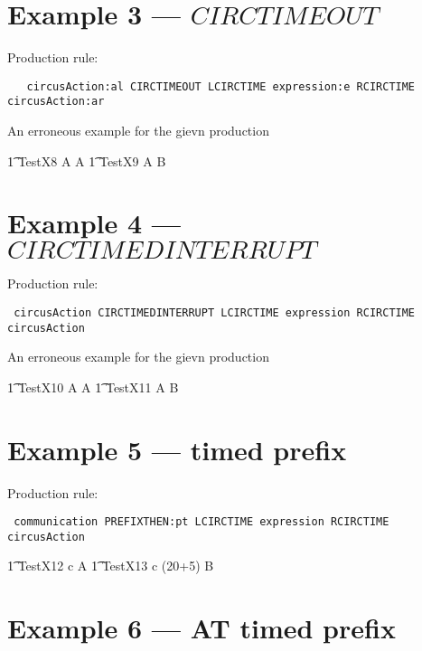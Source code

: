 \section{Example 3 --- $CIRCTIMEOUT$}


Production rule:
\begin{verbatim}
   circusAction:al CIRCTIMEOUT LCIRCTIME expression:e RCIRCTIME  circusAction:ar
\end{verbatim}

An erroneous example for the gievn production 
\begin{circusaction}
	\t1 TestX8 \circdef A  A
	\also
	\t1 TestX9 \circdef  A \circtimeout B 
\end{circusaction}


\section{Example 4 --- $CIRCTIMEDINTERRUPT$}

Production rule:
\begin{verbatim}
 circusAction CIRCTIMEDINTERRUPT LCIRCTIME expression RCIRCTIME circusAction
\end{verbatim}
	
An erroneous example for the gievn production 
\begin{circusaction}
	\t1 TestX10 \circdef A  A
	\also
	\t1 TestX11 \circdef  A \circtimedinterrupt B  \\
\end{circusaction}
		
\section{Example 5 --- timed prefix}

Production rule:
\begin{verbatim}
 communication PREFIXTHEN:pt LCIRCTIME expression RCIRCTIME circusAction
\end{verbatim}

\begin{circusaction}
	\t1 TestX12 \circdef c  A
	\also
	\t1 TestX13 \circdef  c \then (20+5) B
\end{circusaction}


\section{Example 6 --- AT timed prefix}

